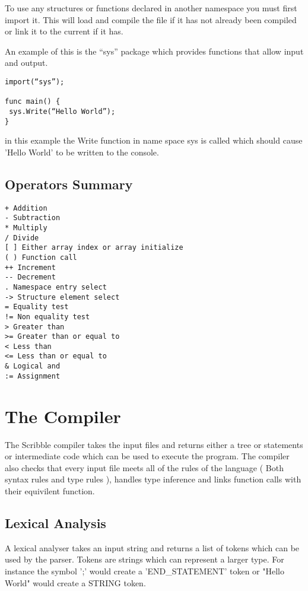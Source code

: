 \documentclass[]{final_report}
\begin{document}
To use any structures or functions declared in another namespace you must first import it. This will load and compile the file if it has not already been compiled or link it to the current if it has.

An example of this is the “sys” package which provides functions that allow input and output.

\begin{verbatim}
import(“sys”);

func main() {
 sys.Write(“Hello World”);
}
\end{verbatim}

in this example the Write function in name space sys is called which should cause 'Hello World' to be written to the console.

\section{Operators Summary}

\begin {verbatim}
+ Addition
- Subtraction
* Multiply
/ Divide
[ ] Either array index or array initialize
( ) Function call
++ Increment
-- Decrement
. Namespace entry select
-> Structure element select
= Equality test
!= Non equality test
> Greater than
>= Greater than or equal to
< Less than
<= Less than or equal to
& Logical and 
:= Assignment
\end{verbatim}

\chapter{The Compiler}

The Scribble compiler takes the input files and returns either a tree or statements or intermediate code which can be used to execute the program. The compiler also checks that every input file meets all of the rules of the language ( Both syntax rules and type rules ), handles type inference and links function calls with their equivilent function.

\section{Lexical Analysis}

A lexical analyser takes an input string and returns a list of tokens which can be used by the parser. Tokens are strings which can represent a larger type. For instance the symbol ';' would create a 'END\_STATEMENT' token or "Hello World" would create a STRING token.
\end{document}
